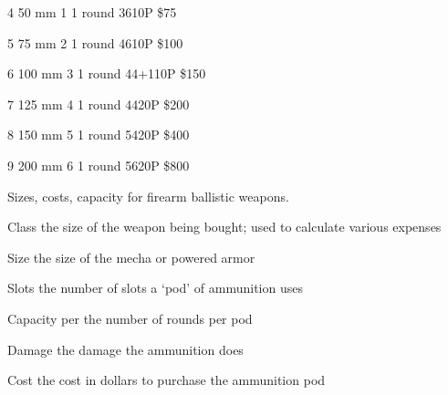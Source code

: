 \documentclass[twoside]{book}
\begin{document}
                  
                   4   
                   50 mm   
                   1   
                   1 round   
                   3610P   
                   \$75   
                  
                  
                   5   
                   75 mm   
                   2   
                   1 round   
                   4610P   
                   \$100   
                  
                  
                   6   
                   100 mm   
                   3   
                   1 round   
                   44+110P   
                   \$150   
                  
                  
                   7   
                   125 mm   
                   4   
                   1 round   
                   4420P   
                   \$200   
                  
                  
                   8   
                   150 mm   
                   5   
                   1 round   
                   5420P   
                   \$400   
                  
                  
                   9   
                   200 mm   
                   6   
                   1 round   
                   5620P   
                   \$800   
                  
                
                Sizes, costs, capacity for firearm ballistic
                 weapons.
              
              
                 Class 
                  the size of the weapon being bought; used to
                 calculate various expenses 
                
              
                 Size 
                  the size of the mecha or powered armor 
                
              
                 Slots 
                  the number of slots a `pod' of
                 ammunition uses 
                
              
                 Capacity per 
                  the number of rounds per pod 
                
              
                 Damage 
                  the damage the ammunition does 
                
              
                 Cost 
                  the cost in dollars to purchase the ammunition
                 pod 
                
\end{document}
